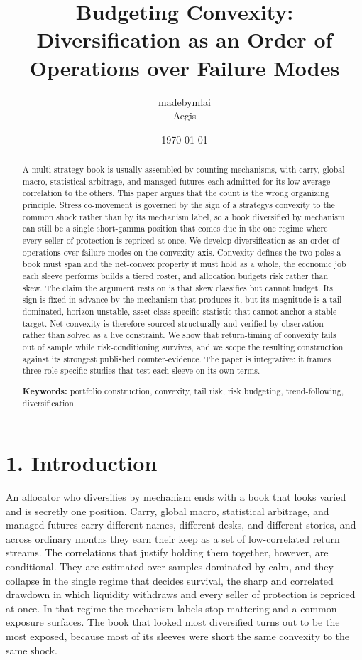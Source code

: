\documentclass[12pt, a4paper]{article}
\title{Budgeting Convexity: Diversification as an Order of Operations over Failure Modes}
\author{madebymlai \\ \small Aegis}
\date{\today}
\begin{document}
\maketitle

\begin{abstract}
\noindent
A multi-strategy book is usually assembled by counting mechanisms, with
carry, global macro, statistical arbitrage, and managed futures each
admitted for its low average correlation to the others. This paper
argues that the count is the wrong organizing principle. Stress
co-movement is governed by the sign of a strategy\textquotesingle s
convexity to the common shock rather than by its mechanism label, so a
book diversified by mechanism can still be a single short-gamma position
that comes due in the one regime where every seller of protection is
repriced at once. We develop diversification as an order of operations
over failure modes on the convexity axis. Convexity defines the two
poles a book must span and the net-convex property it must hold as a
whole, the economic job each sleeve performs builds a tiered roster, and
allocation budgets risk rather than skew. The claim the argument rests on
is that skew classifies but cannot budget. Its sign is fixed in advance by the
mechanism that produces it, but its magnitude is a tail-dominated,
horizon-unstable, asset-class-specific statistic that cannot anchor a
stable target. Net-convexity is therefore sourced structurally and
verified by observation rather than solved as a live constraint. We show
that return-timing of convexity fails out of sample while
risk-conditioning survives, and we scope the resulting construction
against its strongest published counter-evidence. The paper is
integrative: it frames three role-specific studies that test each sleeve
on its own terms.


\vspace{6pt}
\noindent
\textbf{Keywords:} portfolio construction, convexity, tail risk, risk
budgeting, trend-following, diversification.
\end{abstract}

\newpage

\section*{1. Introduction}\label{introduction}

An allocator who diversifies by mechanism ends with a book that looks
varied and is secretly one position. Carry, global macro, statistical
arbitrage, and managed futures carry different names, different desks,
and different stories, and across ordinary months they earn their keep
as a set of low-correlated return streams. The correlations that justify
holding them together, however, are conditional. They are estimated over
samples dominated by calm, and they collapse in the single regime that
decides survival, the sharp and correlated drawdown in which liquidity
withdraws and every seller of protection is repriced at once. In that
regime the mechanism labels stop mattering and a common exposure
surfaces. The book that looked most diversified turns out to be the most
exposed, because most of its sleeves were short the same convexity to
the same shock.
\end{document}
